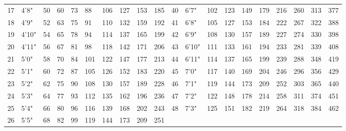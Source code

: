 \begin{normbox}
\begin{tabularx}{\linewidth}{@{} X X X X X X X X X X | X X X X X X X X X X}
17 & 4'8" & 50 & 60 & 73 & 88 & 106 & 127 & 153 & 185 & 40 & 6'7" & 102 & 123 & 149 & 179 & 216 & 260 & 313 & 377\\
18 & 4'9" & 52 & 63 & 75 & 91 & 110 & 132 & 159 & 192 & 41 & 6'8" & 105 & 127 & 153 & 184 & 222 & 267 & 322 & 388\\
19 & 4'10" & 54 & 65 & 78 & 94 & 114 & 137 & 165 & 199 & 42 & 6'9" & 108 & 130 & 157 & 189 & 227 & 274 & 330 & 398\\
20 & 4'11" & 56 & 67 & 81 & 98 & 118 & 142 & 171 & 206 & 43 & 6'10" & 111 & 133 & 161 & 194 & 233 & 281 & 339 & 408\\
21 & 5'0" & 58 & 70 & 84 & 101 & 122 & 147 & 177 & 213 & 44 & 6'11" & 114 & 137 & 165 & 199 & 239 & 288 & 348 & 419\\
22 & 5'1" & 60 & 72 & 87 & 105 & 126 & 152 & 183 & 220 & 45 & 7'0" & 117 & 140 & 169 & 204 & 246 & 296 & 356 & 429\\
23 & 5'2" & 62 & 75 & 90 & 108 & 130 & 157 & 189 & 228 & 46 & 7'1" & 119 & 144 & 173 & 209 & 252 & 303 & 365 & 440\\
24 & 5'3" & 64 & 77 & 93 & 112 & 135 & 162 & 196 & 236 & 47 & 7'2" & 122 & 148 & 178 & 214 & 258 & 311 & 374 & 451\\
25 & 5'4" & 66 & 80 & 96 & 116 & 139 & 168 & 202 & 243 & 48 & 7'3" & 125 & 151 & 182 & 219 & 264 & 318 & 384 & 462\\
26 & 5'5" & 68 & 82 & 99 & 119 & 144 & 173 & 209 & 251 & 									
\end{tabularx}
\end{normbox}
